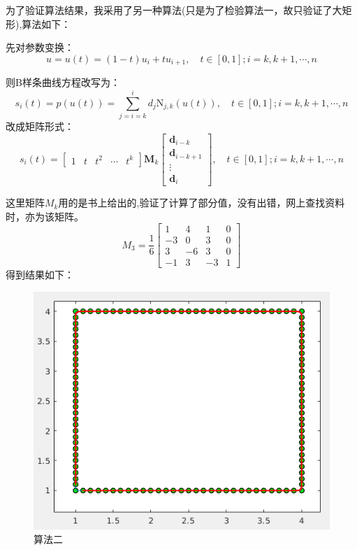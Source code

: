 \documentclass[12pt,a4paper]{article}
\begin{document}
为了验证算法结果，我采用了另一种算法(只是为了检验算法一，故只验证了大矩形),算法如下：

先对参数变换：
\begin{equation}
u=u(t)=(1-t) u_{i}+t u_{i+1}, \quad t \in[0,1] ; i=k, k+1, \cdots, n
\end{equation}

则B样条曲线方程改写为：
\begin{equation}
s_{i}(t)=p(u(t))=\sum_{j=i=k}^{i} d_{j} \mathrm{N}_{j, k}(u(t)), \quad t \in[0,1] ; i=k, k+1, \cdots, n
\end{equation}
改成矩阵形式：
\begin{equation}
s_{i}(t)=\left[\begin{array}{lllll}{1} & {t} & {t^{2}} & {\cdots} & {t^{k}}\end{array}\right] \boldsymbol{M}_{k}\left[\begin{array}{c}{\boldsymbol{d}_{i-k}} \\ {\boldsymbol{d}_{i-k+1}} \\ {\vdots} \\ {\boldsymbol{d}_{i}}\end{array}\right], \quad t \in[0,1] ; i=k, k+1, \cdots, n
\end{equation}

这里矩阵$M_k$用的是书上给出的,验证了计算了部分值，没有出错，网上查找资料时，亦为该矩阵。
\begin{equation}
M_{3}=\frac{1}{6}\left[\begin{array}{cccc}{1} & {4} & {1} & {0} \\ {-3} & {0} & {3} & {0} \\ {3} & {-6} & {3} & {0} \\ {-1} & {3} & {-3} & {1}\end{array}\right]
\end{equation}
得到结果如下：
\begin{figure}[ht]
	\centering
	\includegraphics[scale=0.4]{./figures/false2.png}
	\caption{算法二}
	\label{fig:label}	
\end{figure}
\end{document}
